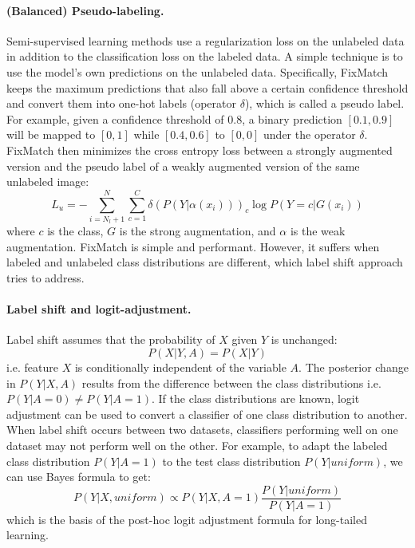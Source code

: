 \paragraph{(Balanced) Pseudo-labeling.}
Semi-supervised learning methods use a regularization loss on the unlabeled data in addition to the classification loss on the labeled data. A simple technique is to use the model's own predictions on the unlabeled data. Specifically, FixMatch \cite{fixmatch} keeps the maximum predictions that also fall above a certain confidence threshold and convert them into one-hot labels (operator $\delta$), which is called a pseudo label. For example, given a confidence threshold of $0.8$, a binary prediction $[0.1, 0.9]$ will be mapped to $[0, 1]$ while $[0.4, 0.6]$ to $[0, 0]$ under the operator $\delta$. FixMatch then minimizes the cross entropy loss between a strongly augmented version  and the pseudo label of a weakly augmented version  of the same unlabeled image:
\begin{equation}
L_u = - \sum_{i=N_l+1}^{N} \sum_{c=1}^C \delta (P(Y|\alpha(x_i)))_c \log P(Y=c|G(x_i))
\label{eq:fixmatch-unlabeled-loss}
\end{equation}
where $c$ is the class, $G$ is the strong augmentation, and $\alpha$ is the weak augmentation. FixMatch is simple and performant. However, it suffers when labeled and unlabeled class distributions are different, which label shift approach tries to address.

\paragraph{Label shift and logit-adjustment.} Label shift assumes that the probability of $X$ given $Y$ is unchanged:
\begin{equation}
P(X|Y,A) = P(X|Y)
\label{eq:label-shift}
\end{equation} 
i.e. feature $X$ is conditionally independent of the variable $A$. The posterior change in $P(Y|X,A)$ results from the difference between the class distributions i.e. $P(Y|A=0) \neq P(Y|A=1)$. 
If the class distributions are known, logit adjustment can be used to convert a classifier of one class distribution to another.
When label shift occurs between two datasets, classifiers performing well on one dataset may not perform well on the other.
For example, to adapt the labeled class distribution $P(Y|A=1)$ to the test class distribution $P(Y|\textit{uniform})$, we can use Bayes formula to get:
\begin{equation}
P(Y|X,\textit{uniform}) \propto P(Y|X,A=1) \frac{P(Y|\textit{uniform})}{P(Y|A=1)}
\label{eq:logit-adjustment}
\end{equation}
which is the basis of the post-hoc logit adjustment formula for long-tailed learning.

